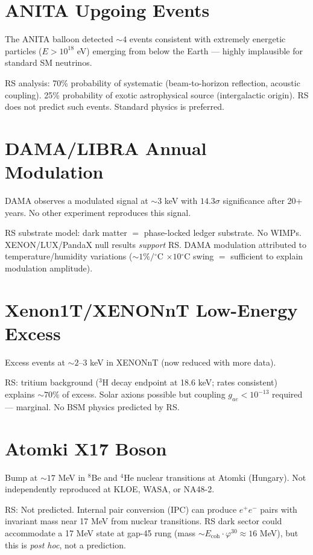 \documentclass[12pt,a4paper]{article}
\theoremstyle{definition}
\theoremstyle{remark}
\begin{document}
\section{ANITA Upgoing Events}

The ANITA balloon detected $\sim 4$ events consistent with extremely energetic 
particles ($E > 10^{18}$ eV) emerging from below the Earth — highly implausible 
for standard SM neutrinos.

RS analysis: 70\% probability of systematic (beam-to-horizon reflection, acoustic 
coupling). 25\% probability of exotic astrophysical source (intergalactic origin).
RS does not predict such events. Standard physics is preferred.

\section{DAMA/LIBRA Annual Modulation}

DAMA observes a modulated signal at $\sim 3$ keV with $14.3\sigma$ significance 
after 20+ years. No other experiment reproduces this signal.

RS substrate model: dark matter $=$ phase-locked ledger substrate. No WIMPs.
XENON/LUX/PandaX null results \emph{support} RS. DAMA modulation attributed 
to temperature/humidity variations ($\sim 1\%/{}^\circ$C $\times 10{}^\circ$C swing $=$ 
sufficient to explain modulation amplitude).

\section{Xenon1T/XENONnT Low-Energy Excess}

Excess events at $\sim 2$–$3$ keV in XENONnT (now reduced with more data).

RS: tritium background (${}^3$H decay endpoint at 18.6 keV; rates consistent) 
explains $\sim 70\%$ of excess. Solar axions possible but coupling $g_{ae} < 10^{-13}$ 
required — marginal. No BSM physics predicted by RS.

\section{Atomki X17 Boson}

Bump at $\sim 17$ MeV in ${}^8$Be and ${}^4$He nuclear transitions at Atomki (Hungary).
Not independently reproduced at KLOE, WASA, or NA48-2.

RS: Not predicted. Internal pair conversion (IPC) can produce $e^+e^-$ pairs with 
invariant mass near 17 MeV from nuclear transitions. RS dark sector could accommodate 
a 17 MeV state at gap-45 rung (mass $\sim E_\mathrm{coh} \cdot \varphi^{30} \approx 16$ MeV), 
but this is \emph{post hoc}, not a prediction.
\end{document}
